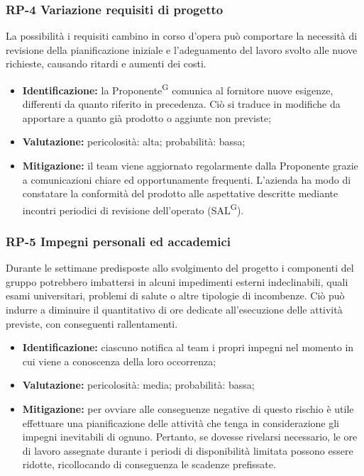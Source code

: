 \documentclass[8pt]{article}
\newcommand{\glossterm}[1]{#1\textsuperscript{G}} %
\begin{document}
\subsubsection{RP-4 Variazione requisiti di progetto}
La possibilità i requisiti cambino in corso d'opera può comportare la necessità di revisione della pianificazione iniziale e l'adeguamento del lavoro svolto alle nuove richieste, causando ritardi e aumenti dei costi.
\begin{itemize}
\setlength\itemsep{0em}
    \item \textbf{Identificazione:} la \glossterm{Proponente} comunica al fornitore nuove esigenze, differenti da quanto riferito in precedenza. Ciò si traduce in modifiche da apportare a quanto già prodotto o aggiunte non previste;
    \item \textbf{Valutazione:} pericolosità: alta; probabilità: bassa;
    \item \textbf{Mitigazione:} il team viene aggiornato regolarmente dalla Proponente grazie a comunicazioni chiare ed opportunamente frequenti. L'azienda ha modo di constatare la conformità del prodotto alle aspettative descritte mediante incontri periodici di revisione dell'operato (\glossterm{SAL}).
\end{itemize}
\subsubsection{RP-5 Impegni personali ed accademici}
Durante le settimane predisposte allo svolgimento del progetto i componenti del gruppo potrebbero imbattersi in alcuni impedimenti esterni indeclinabili, quali esami universitari, problemi di salute o altre tipologie di incombenze. 
Ciò può indurre a diminuire il quantitativo di ore dedicate all'esecuzione delle attività previste, con conseguenti rallentamenti.
\begin{itemize}
\setlength\itemsep{0em}
    \item \textbf{Identificazione:} ciascuno notifica al team i propri impegni nel momento in cui viene a conoscenza della loro occorrenza;
    \item \textbf{Valutazione:} pericolosità: media; probabilità: bassa;
    \item \textbf{Mitigazione:} per ovviare alle conseguenze negative di questo rischio è utile effettuare una pianificazione delle attività che tenga in considerazione gli impegni inevitabili di ognuno. Pertanto, se dovesse rivelarsi necessario, le ore di lavoro assegnate durante i periodi di disponibilità limitata possono essere ridotte, ricollocando di conseguenza le scadenze prefissate. 
\end{itemize}
\end{document}
